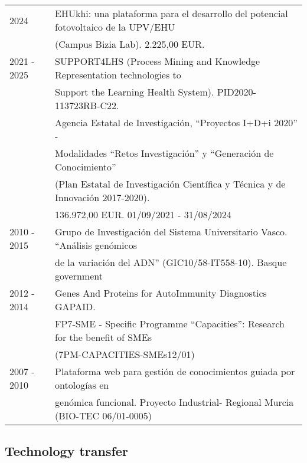 \documentclass[11pt,fullpage]{article}
\begin{document}
\begin{tabular}{ll}
  2024        & EHUkhi: una plataforma para el desarrollo del potencial fotovoltaico de la UPV/EHU \\
              &  (Campus Bizia Lab). 2.225,00 EUR.\\
  2021 - 2025 & SUPPORT4LHS (Process Mining and Knowledge Representation technologies to \\ 
              & Support the Learning Health System). PID2020-113723RB-C22. \\ 
              & Agencia Estatal de Investigación, ``Proyectos I+D+i 2020'' - \\ 
              & Modalidades ``Retos Investigación'' y ``Generación de Conocimiento'' \\ 
              & (Plan Estatal de Investigación Científica y Técnica y de Innovación 2017-2020). \\
              & 136.972,00 EUR. 01/09/2021 - 31/08/2024 \\
  2010 - 2015 & Grupo de Investigación del Sistema Universitario Vasco. ``Análisis genómicos \\  
              & de la variación del ADN'' (GIC10/58-IT558-10). Basque government \\
  2012 - 2014 & Genes And Proteins for AutoImmunity Diagnostics GAPAID. \\ 
              & FP7-SME - Specific Programme ``Capacities'': Research for the benefit of SMEs \\ 
              & (7PM-CAPACITIES-SMEs12/01) \\
  2007 - 2010 & Plataforma web para gesti\'on de conocimientos guiada por ontolog\'ias en \\ 
              & gen\'omica funcional. Proyecto Industrial- Regional Murcia (BIO-TEC 06/01-0005) 
\end{tabular}

\subsection*{Technology transfer}
\end{document}
